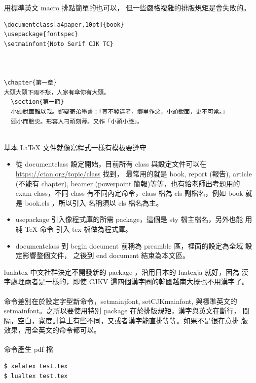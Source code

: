 用標準英文 macro 排點簡單的也可以，
但一些嚴格複雜的排版規矩是會失敗的。

\begin{verbatim}
\documentclass[a4paper,10pt]{book}
\usepackage{fontspec}
\setmainfont{Noto Serif CJK TC}



\chapter{第一章}
大頭大頭下雨不愁，人家有傘你有大頭。
  \section{第一節}
  小頭銳面難以哉。鄭燮寄弟墨書：「其不發達者，鄉里作惡，小頭銳面，更不可當。」
  頭小而臉尖。形容人刁頑刻薄。又作「小頭小臉」。


\end{verbatim}
基本 \LaTeX{} 文件就像寫程式一樣有模板要遵守
\begin{itemize}
  \item 從 documentclass 設定開始，目前所有 class 與設定文件可以在
    \href{https://ctan.org/topic/class}{https://ctan.org/topic/class} 找到，
    最常用的就是 book, report (報告), article (不能有 chapter),
    beamer (powerpoint 簡報)等等，也有給老師出考題用的 exam class，不同 class
    有不同內定命令，class 檔為 cls 副檔名，例如 book 就是 book.cls ，所以引入
    名稱須以 cls 檔名為主。
  \item usepackage 引入像程式庫的所需 package，這個是 sty 檔主檔名，另外也能
    用純 \TeX{} 命令 \verb== 引入 tex 檔做為程式庫。
  \item documentclass 到 begin document 前稱為 preamble 區，裡面的設定為全域
    設定影響整個文件， 之後到 end document 結束為本文區。
\end{itemize}
lualatex 中文社群決定不開發新的 package ，沿用日本的 luatexja 就好，因為
漢字處理兩者是一樣的，即使 CJKV 這四個漢字圈的韓國越南大概也不用漢字了。
\\\\
命令差別在於設定字型新命令，setmainjfont, setCJKmainfont, 與標準英文的
setmainfont。之所以要使用特別 package 在於排版規矩，漢字與英文在斷行，
間隔，空白，寬度計算上有些不同，又或者漢字能直排等等。如果不是很在意排
版效果，用全英文的命令都可以。
\\\\
命令產生 pdf 檔

\begin{verbatim}
$ xelatex test.tex
$ lualtex test.tex
\end{verbatim}

